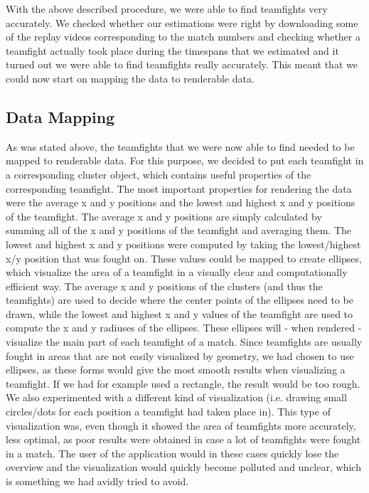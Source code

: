 \documentclass[11pt,twoside,a4paper]{article}
\begin{document}
\newline\newline
With the above described procedure, we were able to find teamfights very accurately. We checked whether our estimations were right by downloading some of the replay videos corresponding to the match numbers and checking whether a teamfight actually took place during the timespans that we estimated and it turned out we were able to find teamfights really accurately. This meant that we could now start on mapping the data to renderable data.

\subsection{Data Mapping}
\label{subsec:datamapping}
As was stated above, the teamfights that we were now able to find needed to be mapped to renderable data. For this purpose, we decided to put each teamfight in a corresponding cluster object, which contains useful properties of the corresponding teamfight. The most important properties for rendering the data were the average x and y positions and the lowest and highest x and y positions of the teamfight. The average x and y positions are simply calculated by summing all of the x and y positions of the teamfight and averaging them. The lowest and highest x and y positions were computed by taking the lowest/highest x/y position that was fought on.
\newline\newline
These values could be mapped to create ellipses, which visualize the area of a teamfight in a visually clear and computationally efficient way. The average x and y positions of the clusters (and thus the teamfights) are used to decide where the center points of the ellipses need to be drawn, while the lowest and highest x and y values of the teamfight are used to compute the x and y radiuses of the ellipses. These ellipses will - when rendered - visualize the main part of each teamfight of a match.
\newline\newline
Since teamfights are usually fought in areas that are not easily visualized by geometry, we had chosen to use ellipses, as these forms would give the most smooth results when visualizing a teamfight. If we had for example used a rectangle, the result would be too rough. We also experimented with a different kind of visualization (i.e. drawing small circles/dots for each position a teamfight had taken place in). This type of visualization was, even though it showed the area of teamfights more accurately, less optimal, as poor results were obtained in case a lot of teamfights were fought in a match. The user of the application would in these cases quickly lose the overview and the visualization would quickly become polluted and unclear, which is something we had avidly tried to avoid.
\end{document}
